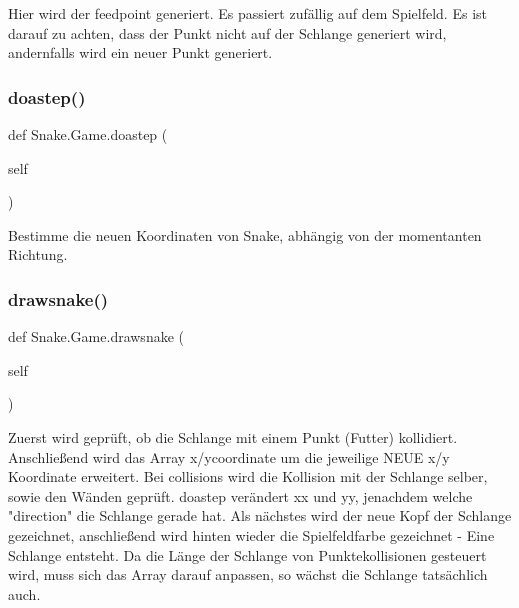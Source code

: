 \begin{DoxyVerb}Hier wird der feedpoint generiert. Es passiert zufällig auf dem Spielfeld. Es ist darauf
zu achten, dass der Punkt nicht auf der Schlange generiert wird, andernfalls wird ein
neuer Punkt generiert.
\end{DoxyVerb}
 \mbox{\label{class_snake_1_1_game_a30c722d4cdac2ba08f691a89a31e3306}} 
\subsubsection{\texorpdfstring{doastep()}{doastep()}}
{\footnotesize\ttfamily def Snake.\+Game.\+doastep (\begin{DoxyParamCaption}\item[{}]{self }\end{DoxyParamCaption})}

\begin{DoxyVerb}Bestimme die neuen Koordinaten von Snake, abhängig von der momentanten Richtung.
\end{DoxyVerb}
 \mbox{\label{class_snake_1_1_game_aee9e8a04fb8c7d56f3b3230fa4d8a66b}} 
\subsubsection{\texorpdfstring{drawsnake()}{drawsnake()}}
{\footnotesize\ttfamily def Snake.\+Game.\+drawsnake (\begin{DoxyParamCaption}\item[{}]{self }\end{DoxyParamCaption})}

\begin{DoxyVerb}Zuerst wird geprüft, ob die Schlange mit einem Punkt (Futter) kollidiert.
Anschließend wird das Array x/ycoordinate um die jeweilige NEUE x/y Koordinate erweitert.
Bei collisions wird die Kollision mit der Schlange selber, sowie den Wänden geprüft.
doastep verändert xx und yy, jenachdem welche "direction" die Schlange gerade hat.
Als nächstes wird der neue Kopf der Schlange gezeichnet, anschließend wird
hinten wieder die Spielfeldfarbe gezeichnet - Eine Schlange entsteht.
Da die Länge der Schlange von Punktekollisionen gesteuert wird, muss sich das
Array darauf anpassen, so wächst die Schlange tatsächlich auch.
\end{DoxyVerb}
 \mbox{\label{class_snake_1_1_game_a98cef3415a4d544424cd9bc57e348ab7}} 
